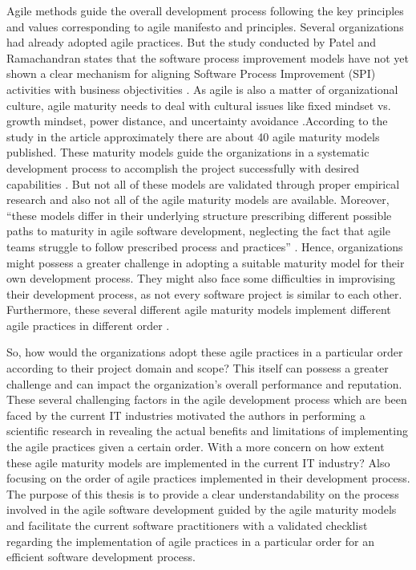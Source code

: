 \documentclass[a4paper,oneside]{bth}
\begin{document}
Agile methods guide the overall development process following the key principles and values corresponding to agile manifesto and principles. Several organizations had already adopted agile practices. But the study conducted by Patel and Ramachandran states that the software process improvement models have not yet shown a clear mechanism for aligning Software Process Improvement (SPI) activities with business objectivities \cite{patel_agile_2009}. As agile is also a matter of organizational culture, agile maturity needs to deal with cultural issues like fixed mindset vs. growth mindset, power distance, and uncertainty avoidance \cite{schweigert_agile_2013}.According to the study in the article \cite{schweigert_agile_2013}  approximately  there are about 40 agile maturity models published. These maturity models guide the organizations in a systematic development process to accomplish the project successfully with desired capabilities \cite{schweigert_agile_2013}. But not all of these models are validated through proper empirical research and also not all of the agile maturity models are available. Moreover, “these models differ in their underlying structure prescribing different possible paths to maturity in agile software development, neglecting the fact that agile teams struggle to follow prescribed process and practices” \cite{patel_agile_2009}\cite{fontana_progressive_2015}. Hence, organizations might possess a greater challenge in adopting a suitable maturity model for their own development process. They might also face some difficulties in improvising their development process, as not every software project is similar to each other. Furthermore, these several different agile maturity models implement different agile practices in different order \cite{sidky_structured_2007}. 
    
So, how would the organizations adopt these agile practices in a particular order according to their project domain and scope? This itself can possess a greater challenge and can impact the organization’s overall performance and reputation. These several challenging factors in the agile development process which are been faced by the current IT industries motivated the authors in performing a scientific research in revealing the actual benefits and limitations of implementing the agile practices given a certain order. With a more concern on how extent these agile maturity models are implemented in the current IT industry? Also focusing on the order of agile practices implemented in their development process. The purpose of this thesis is to provide a clear understandability on the process involved in the agile software development guided by the agile maturity models and facilitate the current software practitioners with a validated checklist regarding the implementation of agile practices in a particular order for an efficient software development process.
\end{document}
